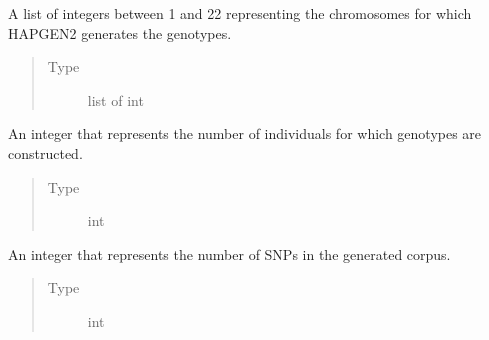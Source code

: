 \documentclass[a4paper,10pt,english]{sphinxhowto}
\begin{document}
\begin{fulllineitems}
\begin{fulllineitems}
\end{fulllineitems}


\begin{fulllineitems}
\label{\detokenize{utils:utils.genotype_corpus_generator.GenotypeCorpusGenerator.chroms}}
A list of integers between 1 and 22 representing the chromosomes
for which HAPGEN2 generates the genotypes.
\begin{quote}\begin{description}
\item[{Type}] \leavevmode
list of int

\end{description}\end{quote}

\end{fulllineitems}


\begin{fulllineitems}
\label{\detokenize{utils:utils.genotype_corpus_generator.GenotypeCorpusGenerator.num_inds}}
An integer that represents the number of individuals for which
genotypes are constructed.
\begin{quote}\begin{description}
\item[{Type}] \leavevmode
int

\end{description}\end{quote}

\end{fulllineitems}


\begin{fulllineitems}
\label{\detokenize{utils:utils.genotype_corpus_generator.GenotypeCorpusGenerator.num_snps}}
An integer that represents the number of SNPs in the generated corpus.
\begin{quote}\begin{description}
\item[{Type}] \leavevmode
int


\end{description}
\end{quote}
\end{fulllineitems}
\end{fulllineitems}
\end{document}
